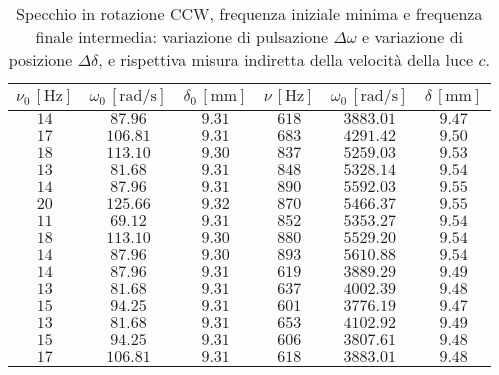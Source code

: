 \documentclass[]{article}
\begin{document}
    \begin{table}
        \centering
        \begin{tabular}{||c|c|c||c|c|c||}
            \hline
            $\nu_0\, [\text{Hz}] $ & $\omega_0\, [\text{rad/s}] $ & $\delta_0\, [\text{mm}] $ & $\nu\, [\text{Hz}] $ & $\omega_0\, [\text{rad/s}] $ & $\delta\, [\text{mm}] $ \\
            \hline\hline
            $14$ & $87.96  $ & $9.31$ & $618$ & $3883.01$ & $9.47$\\\hline
            $17$ & $106.81 $ & $9.31$ & $683$ & $4291.42$ & $9.50$\\\hline
            $18$ & $113.10 $ & $9.30$ & $837$ & $5259.03$ & $9.53$\\\hline
            $13$ & $81.68  $ & $9.31$ & $848$ & $5328.14$ & $9.54$\\\hline
            $14$ & $87.96  $ & $9.31$ & $890$ & $5592.03$ & $9.55$\\\hline
            $20$ & $125.66 $ & $9.32$ & $870$ & $5466.37$ & $9.55$\\\hline
            $11$ & $69.12  $ & $9.31$ & $852$ & $5353.27$ & $9.54$\\\hline
            $18$ & $113.10 $ & $9.30$ & $880$ & $5529.20$ & $9.54$\\\hline
            $14$ & $87.96  $ & $9.30$ & $893$ & $5610.88$ & $9.54$\\\hline
            $14$ & $87.96  $ & $9.31$ & $619$ & $3889.29$ & $9.49$\\\hline
            $13$ & $81.68  $ & $9.31$ & $637$ & $4002.39$ & $9.48$\\\hline
            $15$ & $94.25  $ & $9.31$ & $601$ & $3776.19$ & $9.47$\\\hline
            $13$ & $81.68  $ & $9.31$ & $653$ & $4102.92$ & $9.49$\\\hline
            $15$ & $94.25  $ & $9.31$ & $606$ & $3807.61$ & $9.48$\\\hline
            $17$ & $106.81 $ & $9.31$ & $618$ & $3883.01$ & $9.48$\\\hline
            \end{tabular}
        \caption{Specchio in rotazione CCW, frequenza iniziale minima e frequenza finale intermedia: variazione di pulsazione $\Delta\omega$ e variazione di posizione $\Delta\delta$, e rispettiva misura indiretta della velocità della luce $c$.}
        \label{CCW_min_mid-deta-omega}
    \end{table}
\end{document}
